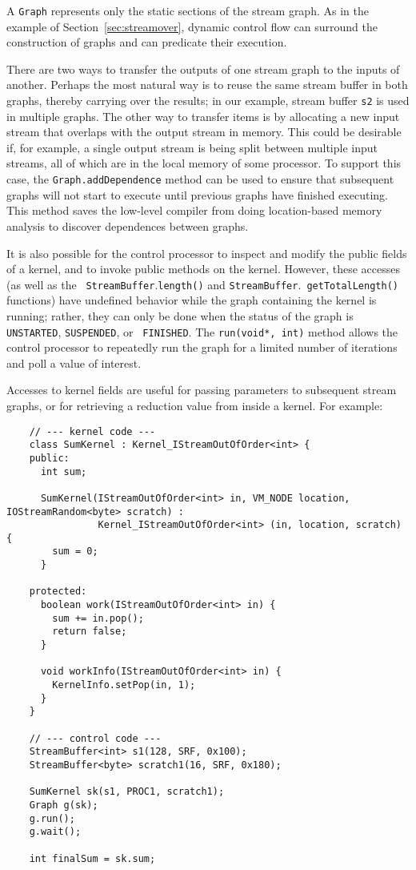 
A {\tt Graph} represents only the static sections of the stream graph.
As in the example of Section~\ref{sec:streamover}, dynamic control
flow can surround the construction of graphs and can predicate their
execution.  

There are two ways to transfer the outputs of one stream graph to the
inputs of another.  Perhaps the most natural way is to reuse the same
stream buffer in both graphs, thereby carrying over the results; in
our example, stream buffer {\tt s2} is used in multiple graphs.  The
other way to transfer items is by allocating a new input stream that
overlaps with the output stream in memory.  This could be desirable
if, for example, a single output stream is being split between
multiple input streams, all of which are in the local memory of some
processor.  To support this case, the {\tt Graph.addDependence} method
can be used to ensure that subsequent graphs will not start to execute
until previous graphs have finished executing.  This method saves the
low-level compiler from doing location-based memory analysis to
discover dependences between graphs.

It is also possible for the control processor to inspect and modify
the public fields of a kernel, and to invoke public methods on the
kernel.  However, these accesses (as well as the {\tt
StreamBuffer}.{\tt length()} and {\tt StreamBuffer}.{\tt
getTotalLength()} functions) have undefined behavior while the graph
containing the kernel is running; rather, they can only be done when
the status of the graph is {\tt UNSTARTED}, {\tt SUSPENDED}, or {\tt
FINISHED}.  The {\tt run(void*, int)} method allows the control
processor to repeatedly run the graph for a limited number of
iterations and poll a value of interest.

Accesses to kernel fields are useful for passing parameters to
subsequent stream graphs, or for retrieving a reduction value from
inside a kernel.  For example: 
{\small
\begin{verbatim}
    // --- kernel code ---
    class SumKernel : Kernel_IStreamOutOfOrder<int> {
    public:
      int sum;

      SumKernel(IStreamOutOfOrder<int> in, VM_NODE location, IOStreamRandom<byte> scratch) : 
                Kernel_IStreamOutOfOrder<int> (in, location, scratch) {
        sum = 0;
      }

    protected:
      boolean work(IStreamOutOfOrder<int> in) {
        sum += in.pop();
        return false;
      }

      void workInfo(IStreamOutOfOrder<int> in) {
        KernelInfo.setPop(in, 1);
      }
    }

    // --- control code ---
    StreamBuffer<int> s1(128, SRF, 0x100);
    StreamBuffer<byte> scratch1(16, SRF, 0x180);

    SumKernel sk(s1, PROC1, scratch1);
    Graph g(sk);
    g.run();
    g.wait();

    int finalSum = sk.sum;
\end{verbatim}}

